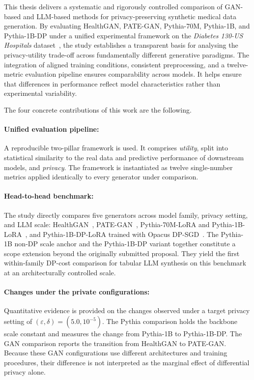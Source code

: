 This thesis delivers a systematic and rigorously controlled comparison of
GAN-based and LLM-based methods for privacy-preserving synthetic medical data
generation. By evaluating HealthGAN, PATE-GAN, Pythia-70M, Pythia-1B, and
Pythia-1B-DP under a unified experimental framework on the
\emph{Diabetes 130-US Hospitals} dataset~\cite{diabetes_db}, the study
establishes a transparent basis for analysing the privacy-utility trade-off
across fundamentally different generative paradigms. The integration of aligned 
training conditions, consistent preprocessing, and a twelve-metric evaluation 
pipeline ensures comparability across models. It helps ensure that differences 
in performance reflect model characteristics rather than experimental variability.

The four concrete contributions of this work are the following.

\paragraph{Unified evaluation pipeline:} A reproducible two-pillar framework 
is used. It comprises \emph{utility}, split into statistical similarity to 
the real data and predictive performance of downstream models, and \emph{privacy}. 
The framework is instantiated as twelve single-number metrics applied identically to
every generator under comparison.

\paragraph{Head-to-head benchmark:} The study directly compares 
five generators across model family, privacy
setting, and LLM scale: HealthGAN~\cite{healthgan},
PATE-GAN~\cite{pategan}, Pythia-70M-LoRA and
Pythia-1B-LoRA~\cite{Biderman2023Pythia,Hu2022LoRA,Miletic2024}, and
Pythia-1B-DP-LoRA trained with Opacus
DP-SGD~\cite{Yousefpour2021Opacus,Abadi2016DPSGD}.
The Pythia-1B non-DP scale anchor and the Pythia-1B-DP variant together 
constitute a scope extension beyond the originally submitted proposal. 
They yield the first within-family DP-cost comparison for tabular LLM 
synthesis on this benchmark at an architecturally controlled scale.

\paragraph{Changes under the private configurations:} Quantitative evidence
is provided on the changes observed under a target privacy setting of
$(\varepsilon,\delta)=(5.0,10^{-5})$. The Pythia comparison holds the
backbone scale constant and measures the change from Pythia-1B to
Pythia-1B-DP. The GAN comparison reports the transition from HealthGAN to
PATE-GAN. Because these GAN configurations use different architectures and
training procedures, their difference is not interpreted as the marginal
effect of differential privacy alone.

